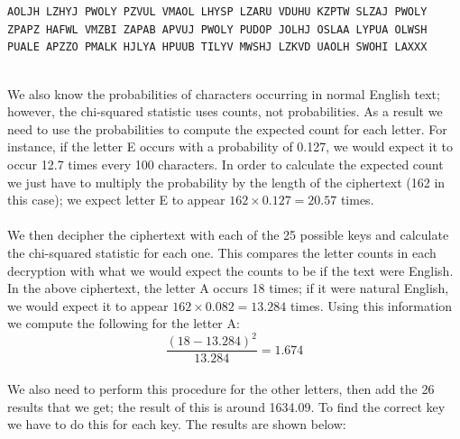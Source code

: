 \documentclass[Lau,binding=0.6cm,oneside]{sapthesis}
\begin{document}
\begin{displayquote}{\small{\texttt{AOLJH LZHYJ PWOLY PZVUL VMAOL LHYSP LZARU VDUHU KZPTW SLZAJ PWOLY ZPAPZ HAFWL VMZBI ZAPAB APVUJ PWOLY PUDOP JOLHJ OSLAA LYPUA OLWSH PUALE APZZO PMALK HJLYA HPUUB TILYV MWSHJ LZKVD UAOLH SWOHI LAXXX}}}
\end{displayquote}
\ \\
We also know the probabilities of characters occurring in normal English text; however, the chi-squared statistic uses counts, not probabilities. As a result we need to use the probabilities to compute the expected count for each letter. For instance, if the letter \textsf{E} occurs with a probability of 0.127, we would expect it to occur 12.7 times every 100 characters. In order to calculate the expected count we just have to multiply the probability by the length of the ciphertext (162 in this case); we expect letter \textsf{E} to appear $ 162 \times 0.127 = 20.57$ times.\\\\
We then decipher the ciphertext with each of the 25 possible keys and calculate the chi-squared statistic for each one. This compares the letter counts in each decryption with what we would expect the counts to be if the text were English. In the above ciphertext, the letter \textsf{A} occurs 18 times; if it were natural English, we would expect it to appear $162 \times 0.082 = 13.284$ times. Using this information we compute the following for the letter \textsf{A}:\\

\begin{equation}
\frac{(18-13.284)^{2}}{13.284} = 1.674
\end{equation}
\ \\
We also need to perform this procedure for the other letters, then add the 26 results that we get; the result of this is around 1634.09. To find the correct key we have to do this for each key. The results are shown below:\\
\end{document}
